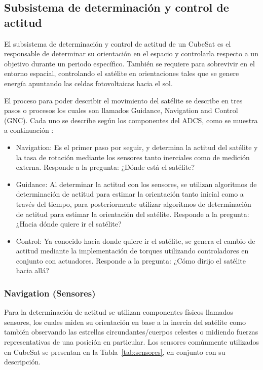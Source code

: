 \subsection{Subsistema de determinación y control de actitud}

El subsistema de determinación y control de actitud de un CubeSat es el responsable de determinar su orientación en el espacio y controlarla respecto a un objetivo durante un periodo específico. También se requiere para sobrevivir en el entorno espacial, controlando el satélite en orientaciones tales que se genere energía apuntando las celdas fotovoltaicas hacia el sol.

El proceso para poder describir el movimiento del satélite se describe en tres pasos o procesos los cuales son llamados Guidance, Navigation and Control (GNC). Cada uno se describe según los componentes del \gls{ADCS}, como se muestra a continuación \cite{ref28}:

\begin{itemize}
	\item Navigation: Es el primer paso por seguir, y determina la actitud del satélite y la tasa de rotación mediante los sensores tanto inerciales como de medición externa. Responde a la pregunta: ¿Dónde está el satélite?
	\item Guidance: Al determinar la actitud con los sensores, se utilizan algoritmos de determinación de actitud para estimar la orientación tanto inicial como a través del tiempo, para posteriormente utilizar algoritmos de determinación de actitud para estimar la orientación del satélite. Responde a la pregunta: ¿Hacia dónde quiere ir el satélite?
	\item Control: Ya conocido hacia donde quiere ir el satélite, se genera el cambio de actitud mediante la implementación de torques utilizando controladores en conjunto con actuadores. Responde a la pregunta: ¿Cómo dirijo el satélite hacia allá?
\end{itemize}

\subsubsection{Navigation (Sensores)}

Para la determinación de actitud se utilizan componentes físicos llamados sensores, los cuales miden su orientación en base a la inercia del satélite como también observando las estrellas circundantes/cuerpos celestes o midiendo fuerzas representativas de una posición en particular\cite{ref6}. Los sensores comúnmente utilizados en CubeSat se presentan en la Tabla~\ref{tab:sensores}, en conjunto con su descripción.


